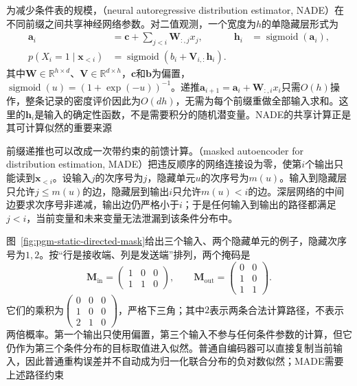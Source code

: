 为减少条件表的规模，（neural autoregressive distribution estimator, NADE）在不同前缀之间共享神经网络参数。对二值观测，一个宽度为$h$的单隐藏层形式为
\begin{equation}
  \label{eq:pgm-static-directed-nade}
  \begin{aligned}
    \bm{a}_i&=\bm{c}+\sum_{j<i}\bm{W}_{:,j}x_j,&
    \bm{h}_i&=\operatorname{sigmoid}(\bm{a}_i),\\
    p(X_i=1\mid\bm{x}_{<i})
      &=\operatorname{sigmoid}
        (b_i+\bm{V}_{i,:}\bm{h}_i).
  \end{aligned}
\end{equation}
其中$\bm{W}\in\mathbb{R}^{h\times d}$、$\bm{V}\in\mathbb{R}^{d\times h}$，$\bm{c}$和$\bm{b}$为偏置，$\operatorname{sigmoid}(u)=(1+\exp(-u))^{-1}$。递推$\bm{a}_{i+1}=\bm{a}_i+\bm{W}_{:,i}x_i$只需$O(h)$操作，整条记录的密度评价因此为$O(dh)$，无需为每个前缀重做全部输入求和。这里的$\bm{h}_i$是输入的确定性函数，不是需要积分的随机潜变量。NADE的共享计算正是其可计算似然的重要来源

前缀递推也可以改成一次带约束的前馈计算。（masked autoencoder for distribution estimation, MADE）把违反顺序的网络连接设为零，使第$i$个输出只能读到$\bm{x}_{<i}$。设输入$j$的次序号为$j$，隐藏单元$u$的次序号为$m(u)$。输入到隐藏层只允许$j\le m(u)$的边，隐藏层到输出$i$只允许$m(u)<i$的边。深层网络的中间边要求次序号非递减，输出边仍严格小于$i$；于是任何输入到输出的路径都满足$j<i$，当前变量和未来变量无法泄漏到该条件分布中。

图~\ref{fig:pgm-static-directed-mask}给出三个输入、两个隐藏单元的例子，隐藏次序号为$1,2$。按“行是接收端、列是发送端”排列，两个掩码是
\[
  \bm{M}_{\mathrm{in}}=
  \begin{pmatrix}1&0&0\\1&1&0\end{pmatrix},\qquad
  \bm{M}_{\mathrm{out}}=
  \begin{pmatrix}0&0\\1&0\\1&1\end{pmatrix}.
\]
它们的乘积为$\left(\begin{smallmatrix}0&0&0\\1&0&0\\2&1&0\end{smallmatrix}\right)$，严格下三角；其中$2$表示两条合法计算路径，不表示两倍概率。第一个输出只使用偏置，第三个输入不参与任何条件参数的计算，但它仍作为第三个条件分布的目标取值进入似然。普通自编码器可以直接复制当前输入，因此普通重构误差并不自动成为归一化联合分布的负对数似然；MADE需要上述路径约束

